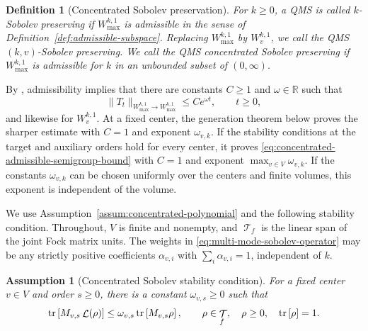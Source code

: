 \documentclass[11pt]{article}
\theoremstyle{myplain}
\newtheorem{stabilityassum}{Assumption}
\theoremstyle{mydefinition}
\newtheorem{defi}[defi]{Definition}
\theoremstyle{remark}
\DeclareMathOperator{\cL}{\mathcal{L}}
\DeclareMathOperator{\cT}{\mathcal{T}}
\DeclareMathOperator{\1}{\mathds{1}}
\newcommand{\tr}[1][]{\operatorname{tr}%
  \ifx#1\empty \else \left[ #1 \right] \fi}
\begin{document}
        \begin{defi}[Concentrated Sobolev preservation]\label{def:concentrated-sobolev-preserving-QMS}
            For $k\geq0$, a QMS is called \emph{$k$-Sobolev preserving} if $W_{\max}^{k,1}$ is admissible in the sense of Definition~\ref{def:admissible-subspace}. Replacing $W_{\max}^{k,1}$ by $W_v^{k,1}$, we call the QMS \emph{$(k,v)$-Sobolev preserving}. We call the QMS \emph{concentrated Sobolev preserving} if $W_{\max}^{k,1}$ is admissible for $k$ in an unbounded subset of $(0,\infty)$.
        \end{defi}
        By \cite[Prop.~I.5.5]{Engel.2000}, admissibility implies that there are constants $C\geq1$ and $\omega\in\mathbb R$ such that
        \begin{equation}\label{eq:concentrated-admissible-semigroup-bound}
            \|T_t\|_{W_{\max}^{k,1}\to W_{\max}^{k,1}}
            \leq Ce^{\omega t},
            \qquad t\geq0,
        \end{equation}
        and likewise for $W_v^{k,1}$. At a fixed center, the generation theorem below proves the sharper estimate with $C=1$ and exponent $\omega_{v,k}$. If the stability conditions at the target and auxiliary orders hold for every center, it proves \eqref{eq:concentrated-admissible-semigroup-bound} with $C=1$ and exponent $\max_{v\in V}\omega_{v,k}$. If the constants $\omega_{v,k}$ can be chosen uniformly over the centers and finite volumes, this exponent is independent of the volume.
        


        
        We use Assumption~\ref{assum:concentrated-polynomial} and the following stability condition. Throughout, $V$ is finite and nonempty, and $\cT_f$ is the linear span of the joint Fock matrix units. The weights in \eqref{eq:multi-mode-sobolev-operator} may be any strictly positive coefficients $\alpha_{v,i}$ with $\sum_i\alpha_{v,i}=1$, independent of $k$.

        \begin{stabilityassum}[Concentrated Sobolev stability condition]\label{assum:concentrated-moments}
            For a fixed center $v\in V$ and order $s\geq0$, there is a constant $\omega_{v,s}\geq0$ such that
            \begin{equation}\label{eq:concentrated-core-generation-drift}
                \tr[M_{v,s}\cL(\rho)]
                \leq \omega_{v,s}\tr[M_{v,s}\rho],
                \qquad \rho \in \cT_f,\quad \rho \geq 0,\quad \tr[\rho] = 1.
            \end{equation}
        \end{stabilityassum}
\end{document}
